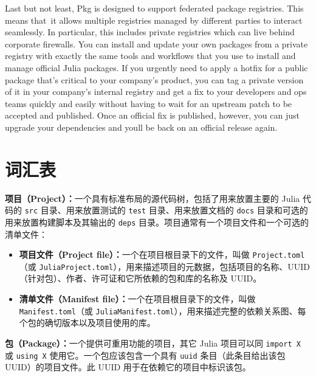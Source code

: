 Last but not least, Pkg is designed to support federated package registries. This means that it allows multiple registries managed by different parties to interact seamlessly. In particular, this includes private registries which can live behind corporate firewalls. You can install and update your own packages from a private registry with exactly the same tools and workflows that you use to install and manage official Julia packages. If you urgently need to apply a hotfix for a public package that’s critical to your company’s product, you can tag a private version of it in your company’s internal registry and get a fix to your developers and ops teams quickly and easily without having to wait for an upstream patch to be accepted and published. Once an official fix is published, however, you can just upgrade your dependencies and you{\textquotesingle}ll be back on an official release again.



\hypertarget{11820197359252038124}{}


\section{词汇表}



\textbf{项目（Project）：}一个具有标准布局的源代码树，包括了用来放置主要的 Julia 代码的 \texttt{src} 目录、用来放置测试的 \texttt{test} 目录、用来放置文档的 \texttt{docs} 目录和可选的用来放置构建脚本及其输出的 \texttt{deps} 目录。项目通常有一个项目文件和一个可选的清单文件：



\begin{itemize}
\item \textbf{项目文件（Project file）：}一个在项目根目录下的文件，叫做 \texttt{Project.toml}（或 \texttt{JuliaProject.toml}），用来描述项目的元数据，包括项目的名称、UUID（针对包）、作者、许可证和它所依赖的包和库的名称及 UUID。


\item \textbf{清单文件（Manifest file）：}一个在项目根目录下的文件，叫做 \texttt{Manifest.toml}（或 \texttt{JuliaManifest.toml}），用来描述完整的依赖关系图、每个包的确切版本以及项目使用的库。

\end{itemize}


\textbf{包（Package）：}一个提供可重用功能的项目，其它 Julia 项目可以同 \texttt{import X} 或 \texttt{using X} 使用它。一个包应该包含一个具有 \texttt{uuid} 条目（此条目给出该包 UUID）的项目文件。此 UUID 用于在依赖它的项目中标识该包。



